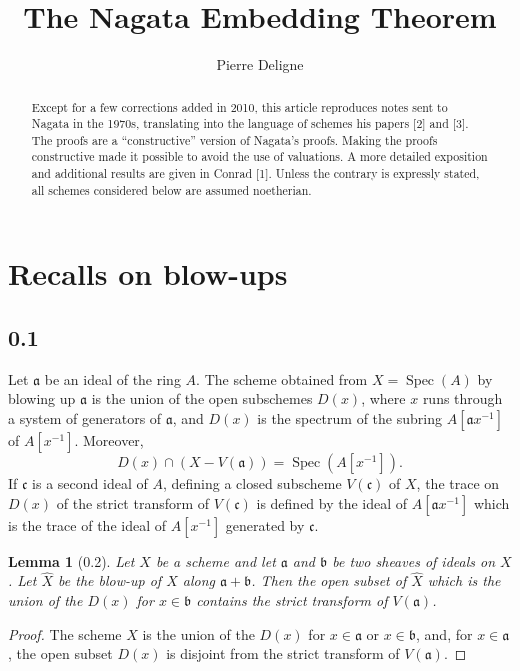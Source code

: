 \documentclass[11pt]{article}
\title{The Nagata Embedding Theorem}
\author{Pierre Deligne}
\date{}
\newtheorem*{lemma}{Lemma}
\newcommand{\Spec}{\operatorname{Spec}}
\newcommand{\wh}[1]{\widehat{#1}}
\begin{document}
\maketitle

\begin{abstract}
Except for a few corrections added in 2010, this article reproduces notes sent to Nagata in the 1970s, translating into the language of schemes his papers [2] and [3]. The proofs are a ``constructive'' version of Nagata's proofs. Making the proofs constructive made it possible to avoid the use of valuations. A more detailed exposition and additional results are given in Conrad [1]. Unless the contrary is expressly stated, all schemes considered below are assumed noetherian.
\end{abstract}

\section{Recalls on blow-ups}

\subsection*{0.1}
Let \(\mathfrak a\) be an ideal of the ring \(A\). The scheme obtained from \(X=\Spec(A)\) by blowing up \(\mathfrak a\) is the union of the open subschemes \(D(x)\), where \(x\) runs through a system of generators of \(\mathfrak a\), and \(D(x)\) is the spectrum of the subring \(A[\mathfrak a x^{-1}]\) of \(A[x^{-1}]\). Moreover,
\[
D(x)\cap (X-V(\mathfrak a))=\Spec(A[x^{-1}]).
\]
If \(\mathfrak c\) is a second ideal of \(A\), defining a closed subscheme \(V(\mathfrak c)\) of \(X\), the trace on \(D(x)\) of the strict transform of \(V(\mathfrak c)\) is defined by the ideal of \(A[\mathfrak a x^{-1}]\) which is the trace of the ideal of \(A[x^{-1}]\) generated by \(\mathfrak c\).

\begin{lemma}[0.2]
Let \(X\) be a scheme and let \(\mathfrak a\) and \(\mathfrak b\) be two sheaves of ideals on \(X\). Let \(\wh X\) be the blow-up of \(X\) along \(\mathfrak a+\mathfrak b\). Then the open subset of \(\wh X\) which is the union of the \(D(x)\) for \(x\in \mathfrak b\) contains the strict transform of \(V(\mathfrak a)\).
\end{lemma}

\begin{proof}
The scheme \(\wh X\) is the union of the \(D(x)\) for \(x\in \mathfrak a\) or \(x\in \mathfrak b\), and, for \(x\in \mathfrak a\), the open subset \(D(x)\) is disjoint from the strict transform of \(V(\mathfrak a)\).
\end{proof}
\end{document}
